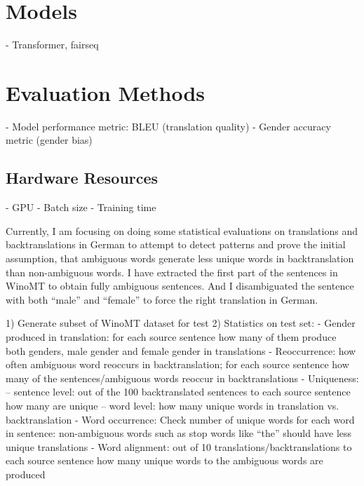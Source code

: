 \section{Models}
\label{sec:Experiments:Models}
- Transformer, fairseq

\section{Evaluation Methods}
\label{sec:Experiments:Evaluation}
- Model performance metric: BLEU (translation quality)
- Gender accuracy metric (gender bias)


\subsection{Hardware Resources}
\label{sec:Experiments:Hardware}
- GPU
- Batch size
- Training time


Currently, I am focusing on doing some statistical evaluations on translations and backtranslations in German to attempt to detect patterns and prove the initial assumption, that ambiguous words generate less unique words in backtranslation than non-ambiguous words. 
I have extracted the first part of the sentences in WinoMT to obtain fully ambiguous sentences. And I disambiguated the sentence with both “male” and “female” to force the right translation in German.

1) Generate subset of WinoMT dataset for test
2) Statistics on test set:
- Gender produced in translation: for each source sentence how many of them produce both genders, male gender and female gender in translations
- Reoccurrence: how often ambiguous word reoccurs in backtranslation; for each source sentence how many of the sentences/ambiguous words reoccur in backtranslations
- Uniqueness: 
-- sentence level: out of the 100 backtranslated sentences to each source sentence how many are unique
-- word level: how many unique words in translation vs. backtranslation
- Word occurrence: Check number of unique words for each word in sentence: non-ambiguous words such as stop words like “the” should have less unique translations 
- Word alignment: out of 10 translations/backtranslations to each source sentence how many unique words to the ambiguous words are produced

